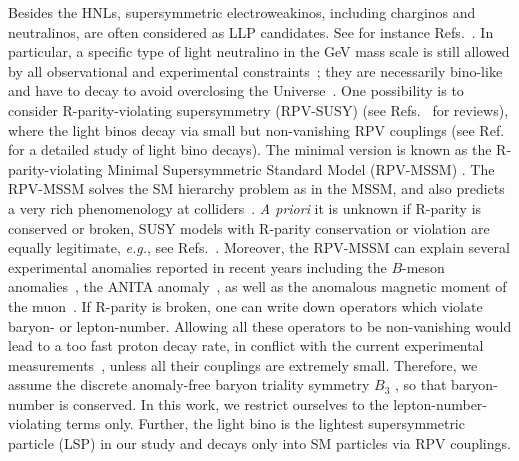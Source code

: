 Besides the HNLs, supersymmetric electroweakinos, including charginos and neutralinos, are often considered as LLP candidates. See for instance Refs.~\cite{ATLAS:2022rme, CMS:2020atg}.
In particular, a specific type of light neutralino in the GeV mass scale is still allowed by all observational and experimental 
constraints~\cite{Choudhury:1999tn, Gogoladze:2002xp, Dreiner:2009er, Dreiner:2009ic, Grifols:1988fw, Ellis:1988aa, 
Lau:1993vf, Dreiner:2003wh, Dreiner:2006gu, Profumo:2008yg, Dreiner:2011fp, Dreiner:2013tja}; they are necessarily 
bino-like~\cite{Dreiner:2009ic,Choudhury:1999tn} and have to decay to avoid overclosing the Universe~\cite{Hooper:2002nq,
Calibbi:2013poa, Bechtle:2015nua}. One possibility is to consider R-parity-violating supersymmetry (RPV-SUSY) (see 
Refs.~\cite{Dreiner:1997uz,Barbier:2004ez,Mohapatra:2015fua} for reviews), where the light binos decay via small but 
non-vanishing RPV couplings (see Ref.~\cite{Domingo:2022emr} for a detailed study of light bino decays).
The minimal version is known as the R-parity-violating Minimal Supersymmetric Standard Model (RPV-MSSM) \cite{Allanach:2003eb}. The 
RPV-MSSM solves the SM hierarchy problem as in the MSSM, and also predicts a very rich phenomenology at 
colliders~\cite{Dreiner:1991pe, deCampos:2007bn, Dercks:2017lfq, Dreiner:2023bvs}.
\textit{A priori} it is unknown if R-parity is conserved or broken, SUSY models with R-parity conservation or violation are equally legitimate, \textit{e.g.}, see 
Refs.~\cite{Ibanez:1991pr, Dreiner:2005rd}.
Moreover, the RPV-MSSM can explain several experimental anomalies reported in recent years including the $B$-meson anomalies~\cite{Trifinopoulos:2019lyo, Hu:2020yvs, Hu:2019ahp, Zheng:2021wnu, 
BhupalDev:2021ipu}, the ANITA anomaly~\cite{Altmannshofer:2020axr, Collins:2018jpg}, as well as the anomalous magnetic
moment of the muon~\cite{Hu:2019ahp, Zheng:2021wnu, BhupalDev:2021ipu}. If R-parity is broken, one can write down 
operators which violate baryon- or lepton-number.
Allowing all these operators to be non-vanishing would lead to a too fast proton decay rate, in conflict with the current experimental measurements~\cite{Chamoun:2020aft, ParticleDataGroup:2022pth}, unless all their couplings are extremely small.
Therefore, we assume the discrete anomaly-free baryon triality symmetry $B_3$ \cite{Dreiner:2006xw, Lee:2010vj, Dreiner:2011ft}, so that baryon-number is conserved.
In this work, we restrict ourselves to the lepton-number-violating terms only.
Further, the light bino is the lightest supersymmetric particle (LSP) in our study and decays only into SM particles via RPV couplings.

